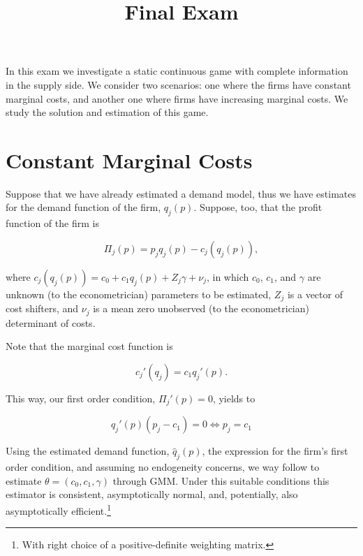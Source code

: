 \documentclass[cm,linguex]{glossa}
\title[Empirical Industrial Organization]{Final Exam}
\author[Carlos Lezama]{
    \spauthor{Carlos Lezama\\
  \institute{\hfill\break
Instituto Tecnológico\\
Autónomo de México}\\
  \small{\hfill\break
clezamaj@itam.mx}
  }%
  }
\theoremstyle{defn}
\theoremstyle{axiom}
\theoremstyle{thm}
\theoremstyle{lem}
\theoremstyle{cor}
\theoremstyle{prop}
\theoremstyle{rmk}
\begin{document}
\sffamily
\maketitle



\rmfamily

\maketitle
\thispagestyle{empty}

In this exam we investigate a static continuous game with complete
information in the supply side. We consider two scenarios: one where the
firms have constant marginal costs, and another one where firms have
increasing marginal costs. We study the solution and estimation of this
game.

\hypertarget{constant-marginal-costs}{%
\section{Constant Marginal Costs}\label{constant-marginal-costs}}

Suppose that we have already estimated a demand model, thus we have
estimates for the demand function of the firm, \(q_j(p)\). Suppose, too,
that the profit function of the firm is

\[ \Pi_j(p) = p_jq_j(p) - c_j\left(q_j(p)\right) , \]

where \(c_j\left(q_j(p)\right) = c_0 + c_1q_j(p) + Z_j\gamma + \nu_j\),
in which \(c_0\), \(c_1\), and \(\gamma\) are unknown (to the
econometrician) parameters to be estimated, \(Z_j\) is a vector of cost
shifters, and \(\nu_j\) is a mean zero unobserved (to the
econometrician) determinant of costs.

Note that the marginal cost function is

\[ c_j'(q_j) = c_1 q_j'(p). \]

This way, our first order condition, \(\Pi_j'(p) = 0\), yields to

\[ q_j'(p) (p_j - c_1) = 0 \iff p_j = c_1 \]

Using the estimated demand function, \(\hat q_j(p)\), the expression for
the firm's first order condition, and assuming no endogeneity concerns,
we way follow \citet{hackmann} to estimate
\(\theta = (c_0, c_1, \gamma)\) through GMM. Under this suitable
conditions this estimator is consistent, asymptotically normal, and,
potentially, also asymptotically efficient.\footnote{With right choice
  of a positive-definite weighting matrix.}
\end{document}
